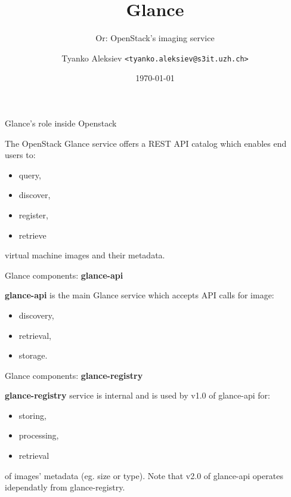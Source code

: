 \documentclass[english,serif,mathserif]{beamer}
\begin{document}
\title[Short Title]{ Glance  }
\subtitle{Or: OpenStack's imaging service}

\author{ Tyanko Aleksiev \texttt{<tyanko.aleksiev@s3it.uzh.ch>}}

\date{\today}

\maketitle

\begin{frame}{Glance's role inside Openstack}

The OpenStack Glance service offers a REST API catalog
which enables end users to:
\begin{itemize}
\item query,
\item discover,
\item register,
\item retrieve 
\end{itemize}
virtual machine images and their metadata. 

\end{frame}

\begin{frame}{Glance components: \textbf{glance-api}}

\textbf{glance-api} is the main Glance service which accepts API calls for image:
 
\begin{itemize}
\item discovery,
\item retrieval,
\item storage.
\end{itemize} 

\end{frame}

\begin{frame}{Glance components: \textbf{glance-registry}}

\textbf{glance-registry} service is internal and is used by v1.0 of
glance-api for: 
\begin{itemize}
\item storing,
\item processing,
\item retrieval
\end{itemize}
of images' metadata (eg. size or type). Note that v2.0 of glance-api
operates idependatly from glance-registry.
\end{frame}
\end{document}
